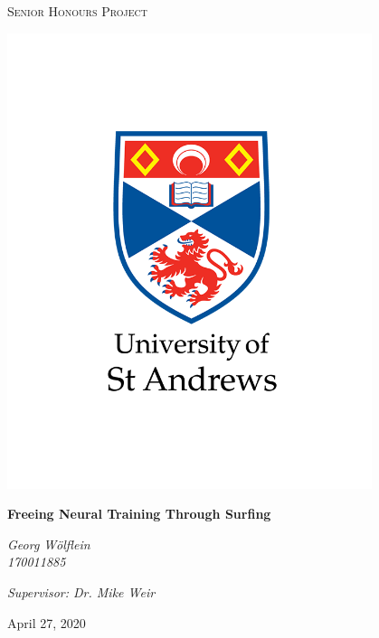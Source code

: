 \documentclass[a4paper,oneside]{book}
\newcommand{\quickwordcount}[1]{%
  \immediate\write18{texcount -1 -sum -merge #1.tex > #1-words}%
  words%
}
\theoremstyle{definition}
\begin{document}
\frontmatter
\begin{titlepage}
    \centering
    
    {\scshape\LARGE Senior Honours Project\par}
    \vspace{0.25cm}
    {\includegraphics[width=0.8\textwidth]{logo.png} \par}
    \vspace{0.25cm}
    {\huge\bfseries Freeing Neural Training Through Surfing\par}
    \vspace{0.5cm}

    \vfill
    {\large \textit{Georg Wölflein\\170011885} \par}
    {\large \textit{Supervisor: Dr. Mike Weir} \par}

    \vspace{0.5cm}

    {April 27, 2020\par}

\end{titlepage}
\end{document}
